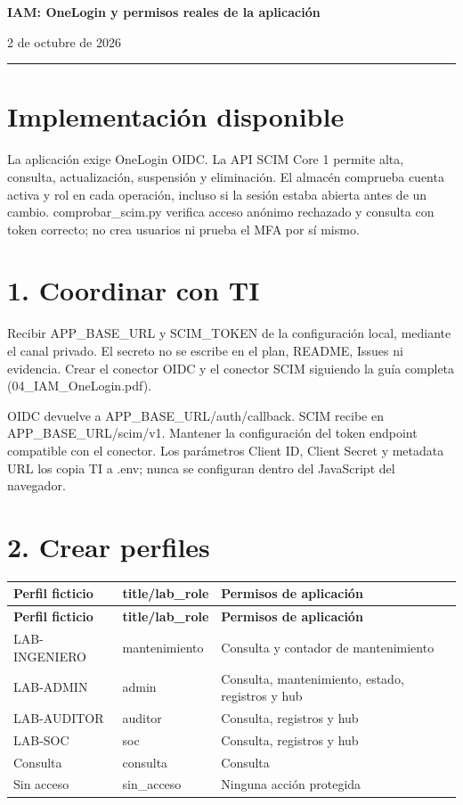 \documentclass[12pt,a4paper]{article}
\begin{document}
{\LARGE\bfseries IAM: OneLogin y permisos reales de la aplicación\par}\vspace{6pt}
2 de octubre de 2026\par\hrule\vspace{10pt}
\section*{Implementación disponible}
La aplicación exige OneLogin OIDC. La API SCIM Core 1 permite alta, consulta, actualización, suspensión y eliminación. El almacén comprueba cuenta activa y rol en cada operación, incluso si la sesión estaba abierta antes de un cambio. \textnormal{comprobar\_\allowbreak{}scim.py} verifica acceso anónimo rechazado y consulta con token correcto; no crea usuarios ni prueba el MFA por sí mismo.\par
{}\section*{1. Coordinar con TI}
Recibir APP\_BASE\_URL y SCIM\_TOKEN de la configuración local, mediante el canal privado. El secreto no se escribe en el plan, README, Issues ni evidencia. Crear el conector OIDC y el conector SCIM siguiendo la guía completa (04\_IAM\_OneLogin.pdf).\par
OIDC devuelve a \textnormal{APP\_\allowbreak{}BASE\_\allowbreak{}URL/\allowbreak{}auth/\allowbreak{}callback}. SCIM recibe en \textnormal{APP\_\allowbreak{}BASE\_\allowbreak{}URL/\allowbreak{}scim/\allowbreak{}v1}. Mantener la configuración del token endpoint compatible con el conector. Los parámetros Client ID, Client Secret y metadata URL los copia TI a \textnormal{.env}; nunca se configuran dentro del JavaScript del navegador.\par
{}\section*{2. Crear perfiles}
{\small\renewcommand{\arraystretch}{1.2}
\begin{longtable}{p{5.027cm}p{5.027cm}p{5.027cm}}
\toprule
\textbf{Perfil ficticio} & \textbf{title/lab\_role} & \textbf{Permisos de aplicación} \\ \midrule\endfirsthead
\textbf{Perfil ficticio} & \textbf{title/lab\_role} & \textbf{Permisos de aplicación} \\ \midrule\endhead
LAB-INGENIERO & mantenimiento & Consulta y contador de mantenimiento \\
LAB-ADMIN & admin & Consulta, mantenimiento, estado, registros y hub \\
LAB-AUDITOR & auditor & Consulta, registros y hub \\
LAB-SOC & soc & Consulta, registros y hub \\
Consulta & consulta & Consulta \\
Sin acceso & sin\_acceso & Ninguna acción protegida \\
\bottomrule\end{longtable}}
\end{document}
